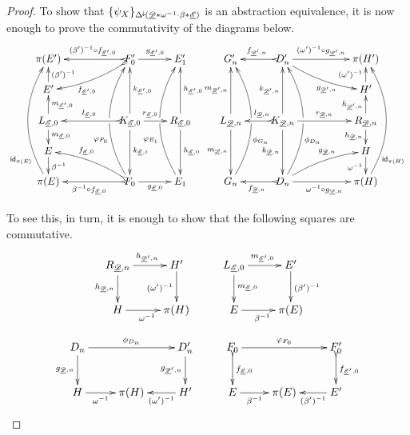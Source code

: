 \begin{proof}
		
		To show that $\{\psi_X\}_{\Delta^{\hspace{-1pt}\downarrow\hspace{-1pt}}(\underline{\mathscr{D}}*\omega^{-1}\cdot \beta*\underline{\mathscr{E}})}$ is an abstraction equivalence, it is now enough to prove the commutativity of the diagrams below.
		\[\xymatrix@R=15pt@C=22pt{\pi(E')&&F'_0 \ar@{>->}[ll]_-{(\beta')^{-1}\circ f_{\der{E}',0}} \ar@{>->}@/^.2cm/[dll]^(.6){f_{\der{E}',0}} \ar[r]^{g_{\der{E}',0}}&E'_1 &G'_n&D'_n \ar[rr]^-{(\omega')^{-1}\circ g_{\der{D}',n}} \ar@/_.2cm/[drr]_(.6){g_{\der{D}',n}} \ar@{>->}[l]_{f_{\der{D}',n}}&&\pi(H')
			\\E' \ar[u]_{(\beta')^{-1}} &&&&&&&H' \ar[u]^{(\omega')^{-1}}
			\\  L_{\der{E}, 0} \ar[u]_{m_{\der{E}', 0}} \ar[d]^{m_{\der{E}, 0}}&& K_{\der{E}, 0} \ar[uu]_{k_{\der{E}', 0}} \ar[dd]^{k_{\der{E}, i}} \ar[r]^(.4){r_{\der{E},0}} \ar@{>->}[ll]_{l_{\der{E},0}} &R_{\der{E}, 0}\ar[uu]_{h_{\der{E}',0}} \ar[dd]^{h_{\der{E},0}} & L_{\der{D}, n} \ar[uu]^{m_{\der{D}',n}} \ar[dd]_{m_{\der{D},n}}& K_{\der{D}, n} \ar[uu]^{k_{\der{D}',n}} \ar[dd]_{k_{\der{D},n}} \ar[rr]^{r_{\der{D},n}} \ar@{>->}[l]_(.4){l_{\der{D},n}} &&R_{\der{D}, n}\ar[u]^{h_{\der{D}',n}} \ar[d]_{h_{\der{D},n}}
			\\E \ar[d]^{\beta^{-1}}&&&&&&&H \ar[d]_{\omega^{-1}}
			\\\pi(E) \ar@/^.7cm/[uuuu]^(.2){\id{\pi(E)}}&&F_0\ar@{>->}[ll]^{\beta^{-1}\circ f_{\der{E},0}}\ar@/^.7cm/[uuuu]^(.35){\varphi_{F_0}}|\hole \ar@{>->}@/_.2cm/[ull]_(.6){f_{\der{E},0}}\ar[r]_{g_{\der{E},0}}&E_1\ar@/^.7cm/[uuuu]^(.35){\varphi_{E_1}}|\hole&G_n \ar@/_.7cm/[uuuu]_(.35){\phi_{G_n}}|\hole&D_n\ar@{>->}[l]^{f_{\der{D},n}}\ar@/_.7cm/[uuuu]_(.35){\phi_{D_n}}|\hole \ar@/^.2cm/[urr]^(.6){g_{\der{D},n}}\ar[rr]_{\omega^{-1}\circ g_{\der{D},n}}&&\pi(H)\ar@/_.7cm/[uuuu]_(.2){\id{\pi(H)}}} \]
		
		To see this, in turn, it is enough to show that	the following squares are commutative.
		\[\xymatrix{R_{\der{D}, n} \ar[d]_{h_{\der{D}, n}}\ar[r]^{h_{\der{D}', n}} & H' \ar[d]_{(\omega')^{-1}} &L_{\der{E}, 0} \ar[d]^{m_{\der{E}, 0}}\ar[r]^{m_{\der{E}', 0}}& E' \ar[d]^{(\beta')^{-1}}\\H\ar[r]_{\omega^{-1}} &\pi(H)&E \ar[r]_{\beta^{-1}} & \pi(E)}\]
		\[\xymatrix{D_n \ar[rr]^{\phi_{D_n}} \ar[d]_{g_{\der{D}, n}}&&D'_n \ar[d]_{g_{\der{D}', n}}&F_0 \ar@{>->}[d]^{f_{\der{E}, 0}} \ar[rr]^{\varphi_{F_0}} && F_0' \ar@{>->}[d]^{f_{\der{E}', 0}}\\H \ar[r]_-{\omega^{-1}} &\pi(H)&H' \ar[l]^-{(\omega')^{-1}}  &E \ar[r]_-{\beta^{-1}} & \pi(E) & E' \ar[l]^-{(\beta')^{-1}}}\]
		

\end{proof}
